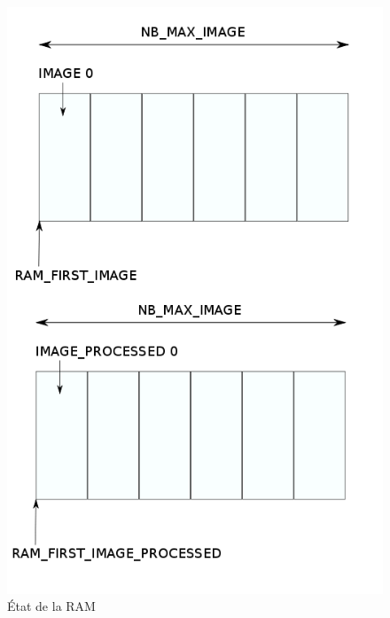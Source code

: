 \documentclass[a4paper,12pt]{report}
\begin{document}
{{{                                                                 \begin{figure}[!h]
	                                                           \centering
	                                                           \includegraphics[scale = 0.3]{ram_management.png}
	                                                           \caption{État de la RAM}
                                                                 \end{figure}

                                                               }

}}
\end{document}
